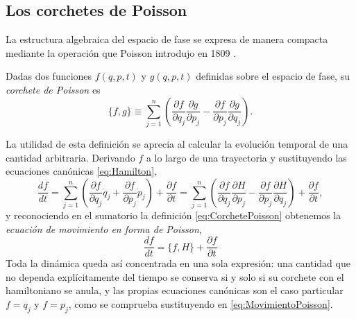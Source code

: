     \subsection{Los corchetes de Poisson}

        La estructura algebraica del espacio de fase se expresa de manera compacta mediante la operación que Poisson introdujo en 1809 \citep{poisson1809memoire}.

        \begin{myDef}\label{def:CorchetePoisson}
            Dadas dos funciones $f(q,p,t)$ y $g(q,p,t)$ definidas sobre el espacio de fase, su \textit{corchete de Poisson} es
            \begin{equation}\label{eq:CorchetePoisson}
                \{f,g\} \equiv \sum_{j=1}^{n}\left(\frac{\partial f}{\partial q_{j}}\frac{\partial g}{\partial p_{j}} - \frac{\partial f}{\partial p_{j}}\frac{\partial g}{\partial q_{j}}\right).
            \end{equation}
        \end{myDef}

        La utilidad de esta definición se aprecia al calcular la evolución temporal de una cantidad arbitraria. Derivando $f$ a lo largo de una trayectoria y sustituyendo las ecuaciones canónicas \eqref{eq:Hamilton},
        \begin{equation}\label{eq:EvolucionPoisson}
            \frac{df}{dt} = \sum_{j=1}^{n}\left(\frac{\partial f}{\partial q_{j}}\dot{q}_{j} + \frac{\partial f}{\partial p_{j}}\dot{p}_{j}\right) + \frac{\partial f}{\partial t}
            = \sum_{j=1}^{n}\left(\frac{\partial f}{\partial q_{j}}\frac{\partial H}{\partial p_{j}} - \frac{\partial f}{\partial p_{j}}\frac{\partial H}{\partial q_{j}}\right) + \frac{\partial f}{\partial t},
        \end{equation}
        y reconociendo en el sumatorio la definición \eqref{eq:CorchetePoisson} obtenemos la \textit{ecuación de movimiento en forma de Poisson},
        \begin{equation}\label{eq:MovimientoPoisson}
            \boxed{\;\frac{df}{dt} = \{f,H\} + \frac{\partial f}{\partial t}\;}
        \end{equation}
        Toda la dinámica queda así concentrada en una sola expresión: una cantidad que no dependa explícitamente del tiempo se conserva si y solo si su corchete con el hamiltoniano se anula, y las propias ecuaciones canónicas son el caso particular $f = q_{j}$ y $f = p_{j}$, como se comprueba sustituyendo en \eqref{eq:MovimientoPoisson}.

